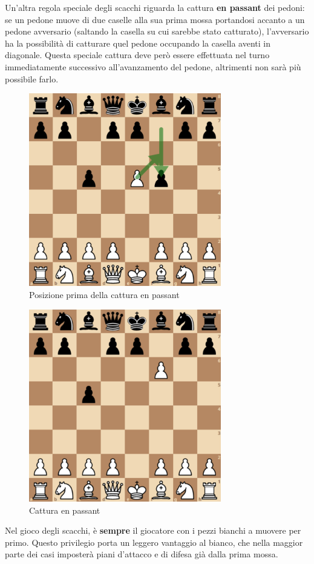 \newpage
Un'altra regola speciale degli scacchi riguarda la cattura \textbf{en passant} dei pedoni: se un pedone muove di due caselle alla sua prima mossa portandosi accanto a un pedone avversario (saltando la casella su cui sarebbe stato catturato), l'avversario ha la possibilità di catturare quel pedone occupando la casella aventi in diagonale. Questa speciale cattura deve però essere effettuata nel turno immediatamente successivo all'avanzamento del pedone, altrimenti non sarà più possibile farlo.
\begin{figure}[!htb]
    \includegraphics[width=8.4cm]{frontmatter/figure/enpassant_prima.pdf}
    \centering
    \caption{Posizione prima della cattura en passant}
    \label{fig:checkmate}
\end{figure}
\begin{figure}[!htb]
    \includegraphics[width=8.4cm]{frontmatter/figure/enpassant_dopo.pdf}
    \centering
    \caption{Cattura en passant}
    \label{fig:checkmate}
\end{figure}
\newpage
Nel gioco degli scacchi, è \textbf{sempre} il giocatore con i pezzi bianchi a muovere per primo. Questo privilegio porta un leggero vantaggio al bianco, che nella maggior parte dei casi imposterà piani d'attacco e di difesa già dalla prima mossa.


